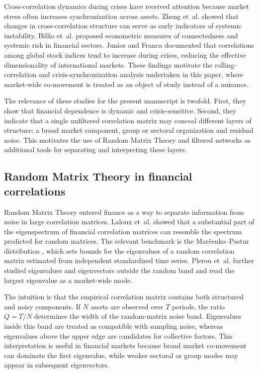 Cross-correlation dynamics during crises have received attention because market stress often increases synchronization across assets. Zheng et~al. \cite{zheng_2012_changes} showed that changes in cross-correlation structure can serve as early indicators of systemic instability. Billio et~al. \cite{billio_2012_econometric} proposed econometric measures of connectedness and systemic risk in financial sectors. Junior and Franca \cite{junior_2012_correlation} documented that correlations among global stock indices tend to increase during crises, reducing the effective dimensionality of international markets. These findings motivate the rolling-correlation and crisis-synchronization analysis undertaken in this paper, where market-wide co-movement is treated as an object of study instead of a nuisance.

The relevance of these studies for the present manuscript is twofold. First, they show that financial dependence is dynamic and crisis-sensitive. Second, they indicate that a single unfiltered correlation matrix may conceal different layers of structure: a broad market component, group or sectoral organization and residual noise. This motivates the use of Random Matrix Theory and filtered networks as additional tools for separating and interpreting these layers.

\subsection{Random Matrix Theory in financial correlations}

Random Matrix Theory entered finance as a way to separate information from noise in large correlation matrices. Laloux et~al. \cite{laloux_1999_noise,laloux_2000_random} showed that a substantial part of the eigenspectrum of financial correlation matrices can resemble the spectrum predicted for random matrices. The relevant benchmark is the Mar\v{c}enko--Pastur distribution \cite{marcenko_1967_distribution}, which sets bounds for the eigenvalues of a random correlation matrix estimated from independent standardized time series. Plerou et~al. \cite{plerou_2002_random} further studied eigenvalues and eigenvectors outside the random band and read the largest eigenvalue as a market-wide mode.

The intuition is that the empirical correlation matrix contains both structured and noisy components. If $N$ assets are observed over $T$ periods, the ratio $Q=T/N$ determines the width of the random-matrix noise band. Eigenvalues inside this band are treated as compatible with sampling noise, whereas eigenvalues above the upper edge are candidates for collective factors. This interpretation is useful in financial markets because broad market co-movement can dominate the first eigenvalue, while weaker sectoral or group modes may appear in subsequent eigenvectors.

